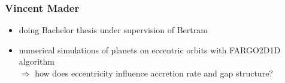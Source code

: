 \documentclass[10 pt]{beamer}
\begin{document}
  \begin{frame}

    \frametitle{Vincent Mader}

    \begin{itemize}
      \item doing Bachelor thesis under supervision of Bertram
      \item numerical simulations of planets on eccentric orbits with 
        FARGO2D1D algorithm \\
        $\Rightarrow$ how does eccentricity influence accretion 
        rate and gap structure?
    \end{itemize}

    \begin{figure}[h!]
      \centering
      \begin{minipage}{.5\framewidth}
        \centering
      \end{minipage}%
      \begin{minipage}{.5\framewidth}
        \centering
      \end{minipage}
    \end{figure}

  \end{frame}
\end{document}
